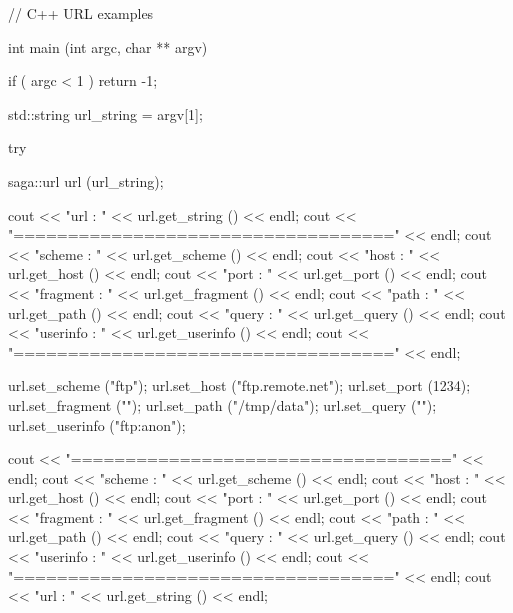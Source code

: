  \begin{mycode}
  // C++ URL examples
  
  int main (int argc, char ** argv)
  {
    if ( argc < 1 )
      return -1;
 
    std::string url_string = argv[1];
 
    try 
    {
      saga::url url (url_string);
 
      cout << "url      : " << url.get_string    () << endl;
      cout << "===================================" << endl;
      cout << "scheme   : " << url.get_scheme    () << endl;
      cout << "host     : " << url.get_host      () << endl;
      cout << "port     : " << url.get_port      () << endl;
      cout << "fragment : " << url.get_fragment  () << endl;
      cout << "path     : " << url.get_path      () << endl;
      cout << "query    : " << url.get_query     () << endl;
      cout << "userinfo : " << url.get_userinfo  () << endl;
      cout << "===================================" << endl;
 
      url.set_scheme    ("ftp");
      url.set_host      ("ftp.remote.net");
      url.set_port      (1234);
      url.set_fragment  ("");
      url.set_path      ("/tmp/data");
      url.set_query     ("");
      url.set_userinfo  ("ftp:anon");
 
      cout << "===================================" << endl;
      cout << "scheme   : " << url.get_scheme    () << endl;
      cout << "host     : " << url.get_host      () << endl;
      cout << "port     : " << url.get_port      () << endl;
      cout << "fragment : " << url.get_fragment  () << endl;
      cout << "path     : " << url.get_path      () << endl;
      cout << "query    : " << url.get_query     () << endl;
      cout << "userinfo : " << url.get_userinfo  () << endl;
      cout << "===================================" << endl;
      cout << "url      : " << url.get_string    () << endl;
    }
  }
 \end{mycode}
 
